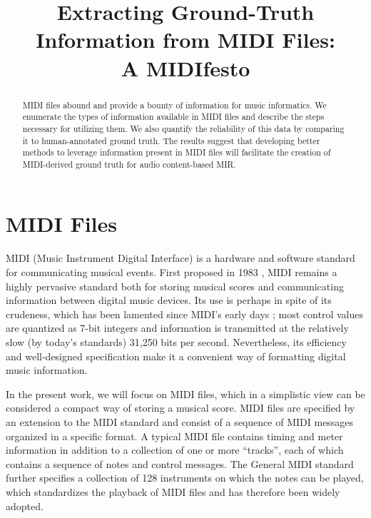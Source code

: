 \documentclass{article}
\title{Extracting Ground-Truth Information from MIDI Files:\\A MIDIfesto}
\begin{document}
\maketitle

\begin{abstract}
MIDI files abound and provide a bounty of information for music informatics.
We enumerate the types of information available in MIDI files and describe the steps necessary for utilizing them.
We also quantify the reliability of this data by comparing it to human-annotated ground truth.
The results suggest that developing better methods to leverage information present in MIDI files will facilitate the creation of MIDI-derived ground truth for audio content-based MIR.
\end{abstract}

\section{MIDI Files}\label{sec:introduction}

MIDI (Music Instrument Digital Interface) is a hardware and software standard for communicating musical events.
First proposed in 1983 \cite{international1983midi}, MIDI remains a highly pervasive standard both for storing musical scores and communicating information between digital music devices.
Its use is perhaps in spite of its crudeness, which has been lamented since MIDI's early days \cite{moore1988dysfunctions}; most control values are quantized as 7-bit integers and information is transmitted at the relatively slow (by today's standards) 31,250 bits per second.
Nevertheless, its efficiency and well-designed specification make it a convenient way of formatting digital music information.

In the present work, we will focus on MIDI files, which in a simplistic view can be considered a compact way of storing a musical score.
MIDI files are specified by an extension to the MIDI standard \cite{international1988standard} and consist of a sequence of MIDI messages organized in a specific format.
A typical MIDI file contains timing and meter information in addition to a collection of one or more ``tracks'', each of which contains a sequence of notes and control messages.
The General MIDI standard further specifies a collection of 128 instruments on which the notes can be played, which standardizes the playback of MIDI files and has therefore been widely adopted.
\end{document}
